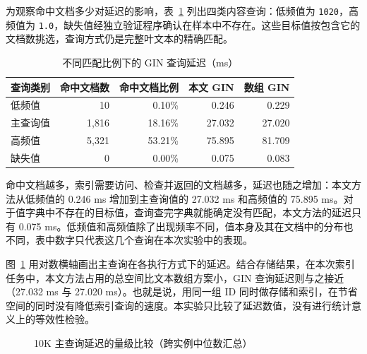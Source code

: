 为观察命中文档多少对延迟的影响，表~\ref{tab:exp-selectivity} 列出四类内容查询：低频值为 \texttt{1020}，高频值为 \texttt{1.0}，缺失值经独立验证程序确认在样本中不存在。这些目标值按包含它的文档数挑选，查询方式仍是完整叶文本的精确匹配。
\begin{table}[htbp]
\centering\small
\caption{不同匹配比例下的 GIN 查询延迟（ms）}
\label{tab:exp-selectivity}
\begin{tabular}{lrrrr}
\toprule
查询类别 & 命中文档数 & 命中文档比例 & 本文 GIN & 数组 GIN \\
\midrule
低频值 & 10 & 0.10\% & 0.246 & 0.229 \\
主查询值 & 1,816 & 18.16\% & 27.032 & 27.020 \\
高频值 & 5,321 & 53.21\% & 75.895 & 81.709 \\
缺失值 & 0 & 0.00\% & 0.075 & 0.083 \\
\bottomrule
\end{tabular}
\end{table}

命中文档越多，索引需要访问、检查并返回的文档越多，延迟也随之增加：本文方法从低频值的 0.246 ms 增加到主查询值的 27.032 ms 和高频值的 75.895 ms。对于值字典中不存在的目标值，查询查完字典就能确定没有匹配，本文方法的延迟只有 0.075 ms。低频值和高频值除了出现频率不同，值本身及其在文档中的分布也不同，表中数字只代表这几个查询在本次实验中的表现。

图~\ref{fig:exp-query-latency} 用对数横轴画出主查询在各执行方式下的延迟。结合存储结果，在本次索引任务中，本文方法占用的总空间比文本数组方案小，GIN 查询延迟则与之接近（27.032 ms 与 27.020 ms）。也就是说，用同一组 ID 同时做存储和索引，在节省空间的同时没有降低索引查询的速度。本实验只比较了延迟数值，没有进行统计意义上的等效性检验。
\begin{figure}[htbp]
\centering
{}
\caption{10K 主查询延迟的量级比较（跨实例中位数汇总）}
\label{fig:exp-query-latency}
\end{figure}

